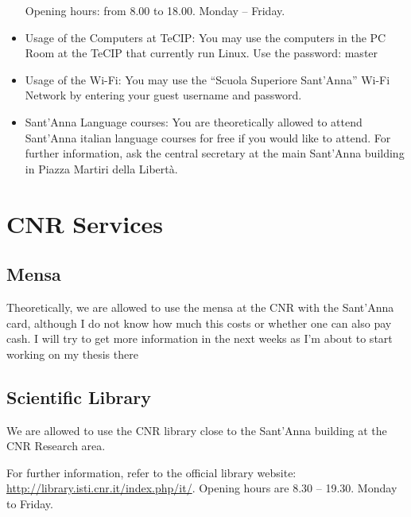 \documentclass[11pt,fleqn,oneside]{book} %
\begin{document}
\begin{itemize}
Opening hours:  from 8.00 to 18.00. Monday – Friday. 
\item Usage of the Computers at TeCIP: You may use the computers in the PC Room at the TeCIP that currently run Linux. Use the password: master
\item Usage of the Wi-Fi: You may use the “Scuola Superiore Sant’Anna” Wi-Fi Network by entering your guest username and password.
\item Sant’Anna Language courses: You are theoretically allowed to attend Sant’Anna italian language courses for free if you would like to attend. For further information, ask the central secretary at the main Sant’Anna building in Piazza Martiri della Libertà. 
\end{itemize}



\chapter{CNR Services}


\section{Mensa}
Theoretically, we are allowed to use the mensa at the CNR with the Sant’Anna card, although I do not know how much this costs or whether one can also pay cash. I will try to get more information in the next weeks as I’m about to start working on my thesis there


\section{Scientific Library}
We are allowed to use the CNR library close to the Sant’Anna building at the CNR Research area.

For further information, refer to the official library website: \url{http://library.isti.cnr.it/index.php/it/}.
Opening hours are 8.30 – 19.30. Monday to Friday.

\end{document}
